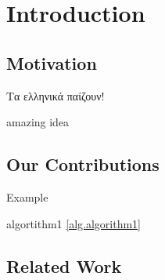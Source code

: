 \chapter{Introduction}\label{chapter:introduction}

\section{Motivation}
\noindent
\begin{greek}Τα ελληνικά παίζουν!\end{greek}

amazing idea 

\section{Our Contributions}

  Example \cite{mitsis2019intelligent}

  algortithm1 \ref{alg.algorithm1}

  

\section{Related Work}
